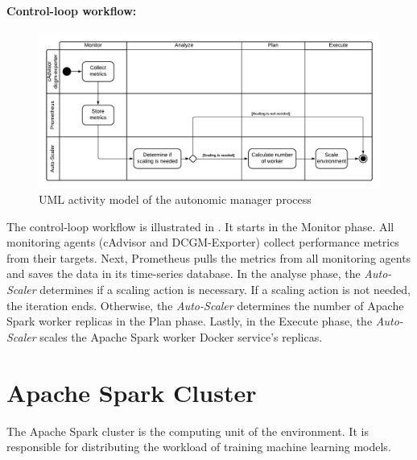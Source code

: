 \paragraph{Control-loop workflow:}
\begin{figure}[h]
\centering
\includegraphics[scale=0.50]{images/05_conceptual_design/autonomic_manager/autonomic_manager_workflow}
\caption{UML activity model of the autonomic manager process}
\label{fig:05_am_monitoring_loop_workflow}
\end{figure}
The control-loop workflow is illustrated in .
It starts in the Monitor phase. All monitoring agents (cAdvisor and DCGM-Exporter) collect performance metrics from their targets. Next, Prometheus pulls the metrics from all monitoring agents and saves the data in its time-series database.
In the analyse phase, the \textit{Auto-Scaler} determines if a scaling action is necessary. If a scaling action is not needed, the iteration ends.
Otherwise, the \textit{Auto-Scaler} determines the number of Apache Spark worker replicas in the Plan phase.
Lastly, in the Execute phase, the \textit{Auto-Scaler} scales the Apache Spark worker Docker service's replicas.


\section{Apache Spark Cluster}
\label{sec:05_spark}
The Apache Spark cluster is the computing unit of the environment. It is responsible for distributing the workload of training machine learning models.

